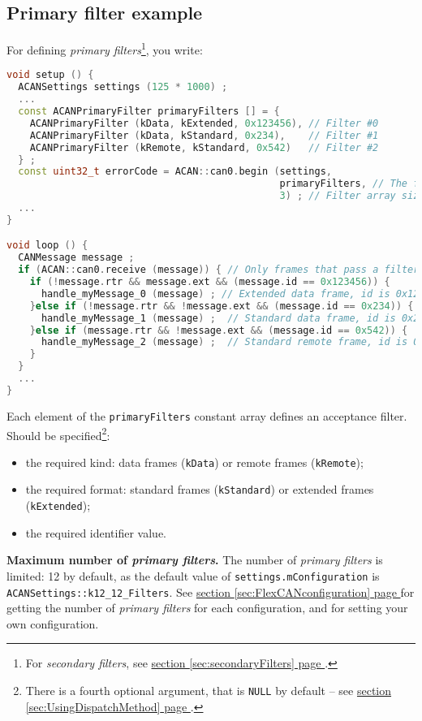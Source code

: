 \documentclass[10pt, a4paper, obeyspaces, openany]{extarticle}
\newcommand\refSectionPage[1]{\hyperref[sec:#1]{section \ref*{sec:#1} page \pageref{sec:#1}}}
\begin{document}
\subsection{Primary filter example}

For defining \emph{primary filters}\footnote{For \emph{secondary filters}, see \refSectionPage{secondaryFilters}.}, you write:
{ \small\begin{lstlisting}[language=c++]
void setup () {
  ACANSettings settings (125 * 1000) ;
  ...
  const ACANPrimaryFilter primaryFilters [] = {
    ACANPrimaryFilter (kData, kExtended, 0x123456), // Filter #0
    ACANPrimaryFilter (kData, kStandard, 0x234),    // Filter #1
    ACANPrimaryFilter (kRemote, kStandard, 0x542)   // Filter #2
  } ;
  const uint32_t errorCode = ACAN::can0.begin (settings,
                                               primaryFilters, // The filter array
                                               3) ; // Filter array size
  ...
}

void loop () {
  CANMessage message ;
  if (ACAN::can0.receive (message)) { // Only frames that pass a filter are retrieved
    if (!message.rtr && message.ext && (message.id == 0x123456)) {
      handle_myMessage_0 (message) ; // Extended data frame, id is 0x123456
    }else if (!message.rtr && !message.ext && (message.id == 0x234)) {
      handle_myMessage_1 (message) ;  // Standard data frame, id is 0x234
    }else if (message.rtr && !message.ext && (message.id == 0x542)) {
      handle_myMessage_2 (message) ;  // Standard remote frame, id is 0x542
    }
  }
  ...
}
\end{lstlisting}}

Each element of the \texttt{primaryFilters} constant array defines an acceptance filter. Should be specified\footnote{There is a fourth optional argument, that is \texttt{NULL} by default -- see \refSectionPage{UsingDispatchMethod}.}:
\begin{itemize}
  \item the required kind: data frames (\texttt{kData}) or remote frames (\texttt{kRemote});
  \item the required format: standard frames (\texttt{kStandard}) or extended frames (\texttt{kExtended});
  \item the required identifier value.
\end{itemize}


{\bf Maximum number of \emph{primary filters}.} The number of \emph{primary filters} is limited: 12 by default, as the default value of \texttt{settings.mConfiguration} is \texttt{ACANSettings::k12\_12\_Filters}. See \refSectionPage{FlexCANconfiguration} for getting the number of \emph{primary filters} for each configuration, and for setting your own configuration.
\end{document}
